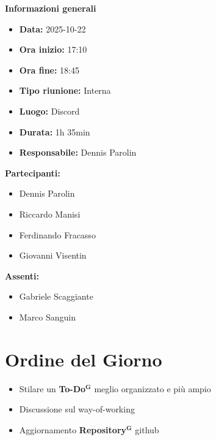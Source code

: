 \documentclass[a4paper,12pt]{article}
\newcommand{\term}[1]{\textbf{#1}$^\mathbf{G}$}
\begin{document}
\clearpage
{\large \textbf{Informazioni generali}}
{\footnotesize
{}

\begin{itemize}
    \item \textbf{Data:} 2025-10-22
    \item \textbf{Ora inizio:} 17:10
    \item \textbf{Ora fine:} 18:45
    \item \textbf{Tipo riunione:} Interna
    \item \textbf{Luogo:} Discord
    \item \textbf{Durata:} 1h 35min
    \item \textbf{Responsabile:} Dennis Parolin
\end{itemize}

\vspace{0.2cm}

\textbf{Partecipanti:}
\begin{itemize}
    \item Dennis Parolin
    \item Riccardo Manisi
    \item Ferdinando Fracasso
    \item Giovanni Visentin
\end{itemize}

\textbf{Assenti:}
\begin{itemize}
    \item Gabriele Scaggiante
    \item Marco Sanguin
\end{itemize}
}

\vspace{0.5cm}

\vspace{0.8cm}

\clearpage
\tableofcontents
\thispagestyle{empty} %
\clearpage

\section{Ordine del Giorno}
\begin{itemize}
    \item Stilare un \term{To-Do} meglio organizzato e più ampio
    \item Discussione sul way-of-working
    \item Aggiornamento \term{Repository} github
\end{itemize}
\end{document}
